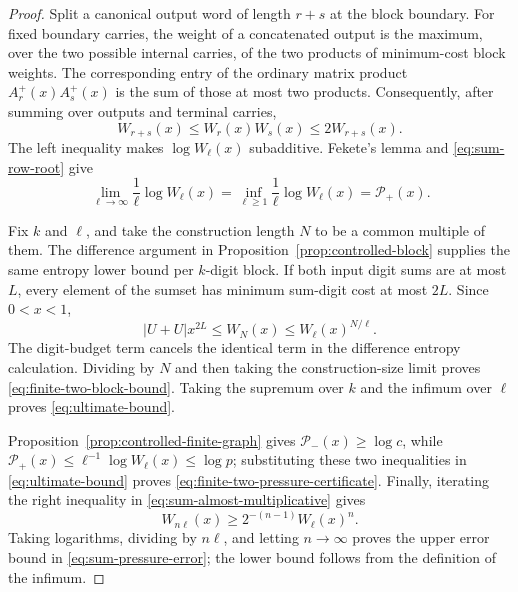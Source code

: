 \documentclass[11pt]{article}
\newcommand{\card}[1]{\lvert #1\rvert}
\begin{document}
\begin{proof}
Split a canonical output word of length $r+s$ at the block boundary.  For
fixed boundary carries, the weight of a concatenated output is the maximum,
over the two possible internal carries, of the two products of minimum-cost
block weights.  The corresponding entry of the ordinary matrix product
$A^+_r(x)A^+_s(x)$ is the sum of those at most two products.  Consequently,
after summing over outputs and terminal carries,
\begin{equation}\label{eq:sum-almost-multiplicative}
 W_{r+s}(x)\le W_r(x)W_s(x)\le2W_{r+s}(x).
\end{equation}
The left inequality makes $\log W_\ell(x)$ subadditive.  Fekete's lemma and
\eqref{eq:sum-row-root} give
\[
 \lim_{\ell\to\infty}\frac1\ell\log W_\ell(x)
 =\inf_{\ell\ge1}\frac1\ell\log W_\ell(x)
 =\mathcal P_+(x).
\]

Fix $k$ and $\ell$, and take the construction length $N$ to be a common
multiple of them.  The difference argument in
Proposition~\ref{prop:controlled-block} supplies the same entropy lower
bound per $k$-digit block.  If both input digit sums are at most $L$, every
element of the sumset has minimum sum-digit cost at most $2L$.  Since
$0<x<1$,
\[
 \card{U+U}x^{2L}\le W_N(x)
 \le W_\ell(x)^{N/\ell}.
\]
The digit-budget term cancels the identical term in the difference entropy
calculation.  Dividing by $N$ and then taking the construction-size limit
proves \eqref{eq:finite-two-block-bound}.  Taking the supremum over $k$ and
the infimum over $\ell$ proves \eqref{eq:ultimate-bound}.

Proposition~\ref{prop:controlled-finite-graph} gives
$\mathcal P_-(x)\ge\log c$, while
$\mathcal P_+(x)\le\ell^{-1}\log W_\ell(x)\le\log p$; substituting these
two inequalities in \eqref{eq:ultimate-bound} proves
\eqref{eq:finite-two-pressure-certificate}.  Finally, iterating the right
inequality in \eqref{eq:sum-almost-multiplicative} gives
\[
 W_{n\ell}(x)\ge 2^{-(n-1)}W_\ell(x)^n.
\]
Taking logarithms, dividing by $n\ell$, and letting $n\to\infty$ proves the
upper error bound in \eqref{eq:sum-pressure-error}; the lower bound follows
from the definition of the infimum.
\end{proof}
\end{document}
